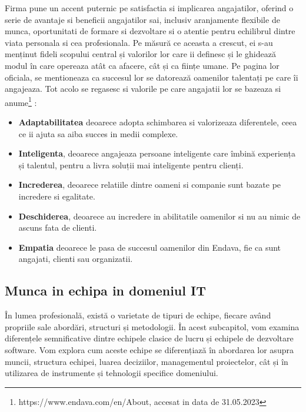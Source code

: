 \documentclass[a4paper, 12pt]{article}
\begin{document}
	\quad \quad Firma pune un accent puternic pe satisfactia si implicarea angajatilor, oferind o serie de avantaje si beneficii angajatilor sai, inclusiv aranjamente flexibile de munca, oportunitati de formare si dezvoltare si o atentie pentru echilibrul dintre viata personala si cea profesionala. Pe măsură ce aceasta a crescut, ei s-au menținut fideli scopului central și valorilor lor care ii definesc și le ghidează modul în care opereaza  atât ca afacere, cât și ca ființe umane. Pe pagina lor oficiala, se mentioneaza ca succesul lor se datorează oamenilor talentați pe care îi angajeaza. Tot acolo se regasesc si valorile pe care angajatii lor se bazeaza si anume\footnote{https://www.endava.com/en/About, accesat in data de 31.05.2023} :
	\begin{itemize}

	\item  \textbf{Adaptabilitatea} deoarece adopta schimbarea si valorizeaza diferentele, ceea ce ii ajuta sa aiba succes in medii complexe.
	\item \textbf{Inteligenta}, deoarece angajeaza persoane inteligente care îmbină experiența și talentul, pentru a livra soluții mai inteligente pentru clienți.
	\item \textbf{Increderea}, deoarece relatiile dintre oameni si companie sunt bazate pe incredere si egalitate.
	\item \textbf{Deschiderea}, deoarece au incredere in abilitatile oamenilor si nu au nimic de ascuns fata de clienti.
	\item \textbf{Empatia} deoarece le pasa de succesul oamenilor din Endava, fie ca sunt angajati, clienti sau organizatii.

	\end{itemize}

	\subsection{Munca in echipa in domeniul IT}

	\quad\quad În lumea profesională, există o varietate de tipuri de echipe, fiecare având propriile sale abordări, structuri și metodologii. În acest subcapitol, vom examina diferențele semnificative dintre echipele clasice de lucru și echipele de dezvoltare software. Vom explora cum aceste echipe se diferențiază în abordarea lor asupra muncii, structura echipei, luarea deciziilor, managementul proiectelor, cât și în utilizarea de instrumente și tehnologii specifice domeniului.
\end{document}
